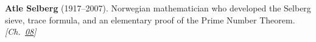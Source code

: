 \textbf{Atle Selberg} (1917–2007). Norwegian mathematician who developed the Selberg sieve, trace formula, and an elementary proof of the Prime Number Theorem. \emph{[Ch.~\hyperref[ch:boundedprimegaps]{08}]}

